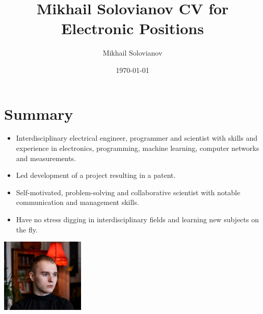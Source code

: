 \documentclass{article}
\title{ Mikhail Solovianov CV for Electronic Positions}
\author{Mikhail Solovianov}
\date{\today}
\begin{document}
 
\makecvtitle %

\section{Summary}
\begin{minipage}{0.7\textwidth}
   \begin{itemize}
      \item Interdisciplinary electrical engineer, programmer and scientist with skills and experience in electronics, programming, machine learning, computer networks and measurements.
      \item Led development of a  project resulting in a patent.
      \item Self-motivated, problem-solving and collaborative scientist with notable communication and management skills.
      \item Have no stress digging in interdisciplinary fields and learning new subjects on the fly.
      \end{itemize}
   \end{minipage}%
   \hfill
   \begin{minipage}{0.3\textwidth}
      \includegraphics[width=4cm,right]{picture.jpg}
\end{minipage}%
\end{document}
